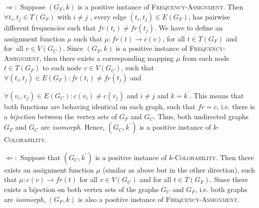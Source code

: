 $\Rightarrow :$ Suppose $(G_{F},k)$ is a positive instance of \textsc{%
Frequency-Assignment}. Then $\forall t_{i},t_{j}\in T(G_{F})$ with $i\neq j$%
, every edge $(t_{i},t_{j})\in E(G_{F})$, has pairwise different frequencies
such that $fr(t_{i})\neq fr(t_{j})$. We have to define an assignment
function $\mu $ such that $\mu :fr(t)\rightarrow c(v)$, for all $t\in
T(G_{F})$ and for\ all $v\in V(G_{C})$. Since $(G_{F},k)$ is a positive
instance of \textsc{Frequency-Assignment}, then there exists a corresponding
mapping $\mu $ from each node $t\in T(G_{F})$ to each node $v\in V(G_{C})$,
such that $\forall (t_{i},t_{j})\in E(G_{F}):fr(t_{i})\neq fr(t_{j})$ and 

$\forall (v_{i},v_{j})\in E(G_{C}):c(v_{i})\neq c(v_{j})$ and $i\neq j$ and $%
k=k^{\prime }$. This means that both functions are behaving identical on
each graph, such that $fr=c$, i.e. there is a \textit{bijection} between the
vertex sets of $G_{F}$ and $G_{C}$. Thus, both undirected graphs $G_{F}$ and 
$G_{C}$ are \textit{isomorph}. Hence, $(G_{C},k^{\prime })$ is a positive
instance of $k$\textsc{-Colorability}$.$

$\Leftarrow :$ Suppose that $(G_{C},k^{\prime })$ is a positive instance of $%
k$\textsc{-Colorability}. Then there exists an assignment function $\mu $
(similar as above but in the other direction), such that $\mu
:c(v)\rightarrow fr(t)$ for all $v\in V(G_{C})$ and for all $t\in T(G_{F})$.
Since there exists a bijection on both vertex sets of the graphs $G_{C}$ and 
$G_{F}$, i.e. both graphs are \textit{isomorph}, $(G_{F},k)$ is also a
positive instance of \textsc{Frequency-Assignment}.

\bigskip 
